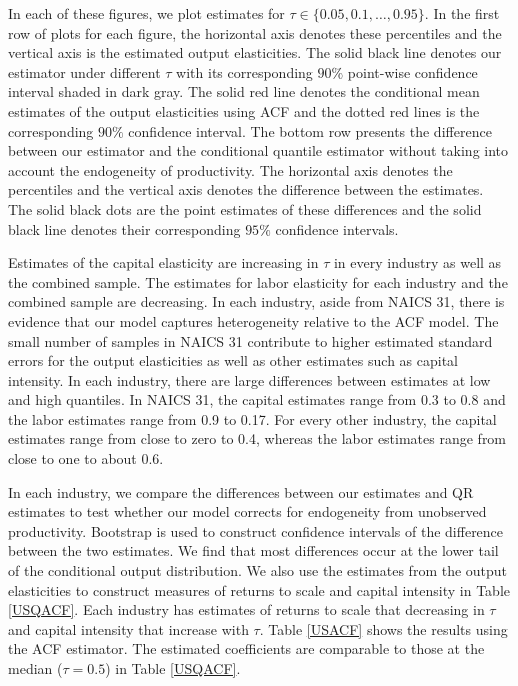 \documentclass[12pt]{article}
\begin{document}
In each of these figures, we plot estimates for $\tau\in\{0.05, 0.1,\dots, 0.95\}$. In the first row of plots for each figure, the horizontal axis denotes these percentiles and the vertical axis is the estimated output elasticities. The solid black line denotes our estimator under different $\tau$ with its corresponding $90\%$ point-wise confidence interval shaded in dark gray. The solid red line denotes the conditional mean estimates of the output elasticities using ACF and the dotted red lines is the corresponding $90\%$ confidence interval. The bottom row presents the difference between our estimator and the conditional quantile estimator without taking into account the endogeneity of productivity. The horizontal axis denotes the percentiles and the vertical axis denotes the difference between the estimates. The solid black dots are the point estimates of these differences and the solid black line denotes their corresponding $95\%$ confidence intervals. 

Estimates of the capital elasticity are increasing in $\tau$ in every industry as well as the combined sample. The estimates for labor elasticity for each industry and the combined sample are decreasing. In each industry, aside from NAICS 31, there is evidence that our model captures heterogeneity relative to the ACF model. The small number of samples in NAICS 31 contribute to higher estimated standard errors for the output elasticities as well as other estimates such as capital intensity. In each industry, there are large differences between estimates at low and high quantiles. In NAICS 31, the capital estimates range from 0.3 to 0.8 and the labor estimates range from 0.9 to 0.17. For every other industry, the capital estimates range from close to zero to 0.4, whereas the labor estimates range from close to one to about 0.6.

In each industry, we compare the differences between our estimates and QR estimates to test whether our model corrects for endogeneity from unobserved productivity. Bootstrap is used to construct confidence intervals of the difference between the two estimates. We find that most differences occur at the lower tail of the conditional output distribution. We also use the estimates from the output elasticities to construct measures of returns to scale and capital intensity in Table \ref{USQACF}. Each industry has estimates of returns to scale that decreasing in $\tau$ and capital intensity that increase with $\tau$. Table \ref{USACF} shows the results using the ACF estimator. The estimated coefficients are comparable to those at the median ($\tau=0.5$) in Table \ref{USQACF}.
\end{document}
